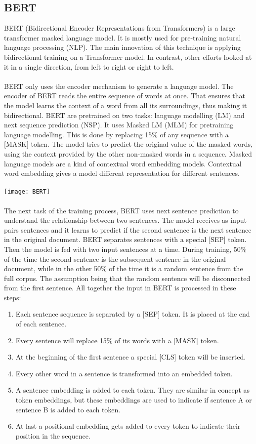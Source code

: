 \subsection{BERT}
BERT (Bidirectional Encoder Representations from Transformers) is a large transformer masked language model. It is mostly used for pre-training natural language processing (NLP). The main innovation of this technique is applying bidirectional training on a Transformer model. In contrast, other efforts looked at it in a single direction, from left to right or right to left. \\\\
BERT only uses the encoder mechanism to generate a language model. The encoder of BERT reads the entire sequence of words at once. That ensures that the model learns the context of a word from all its surroundings, thus making it bidirectional. BERT are pretrained on two tasks: language modelling (LM) and next sequence prediction (NSP). It uses Masked LM (MLM) for pretraining language modelling. This is done by replacing 15\% of any sequence with a [MASK] token. The model tries to predict the original value of the masked words, using the context provided by the other non-masked words in a sequence. Masked language models are a kind of contextual word embedding models. Contextual word embedding gives a model different representation for different sentences.\\\\ 
\texttt{[image: BERT]}
\\\\ The next task of the training process, BERT uses next sentence prediction to understand the relationship between two sentences. The model receives as input pairs sentences and it learns to predict if the second sentence is the next sentence in the original document. BERT separates sentences with a special [SEP] token. Then the model is fed with two input sentences at a time. During training, 50\% of the time the second sentence is the subsequent sentence in the original document, while in the other 50\% of the time it is a random sentence from the full corpus. The assumption being that the random sentence will be disconnected from the first sentence.
All together the input in BERT is processed in these steps:
\begin{enumerate}
    \item Each sentence sequence is separated by a [SEP] token. It is placed at the end of each sentence.
    \item Every sentence will replace 15\% of its words with a [MASK] token.
    \item At the beginning of the first sentence a special [CLS] token will be inserted.
    \item Every other word in a sentence is transformed into an embedded token.
    \item A sentence embedding is added to each token. They are similar in concept as token embeddings, but these embeddings are used to indicate if sentence A or sentence B is added to each token.
    \item At last a positional embedding gets added to every token to indicate their position in the sequence.
\end{enumerate}

